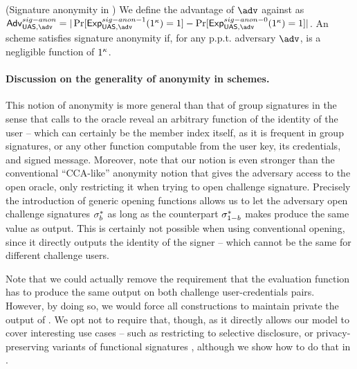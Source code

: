 \begin{definition}{(Signature anonymity in \UAS)}
  \label{def:sign-anonymity-uas}  
  We define the advantage \AdvSigAnon of $\adv$ against \ExpSigAnonb as
  $\AdvSigAnon=|\Pr\lbrack\ExpSigAnono(1^\secpar)=1\rbrack-
  \Pr\lbrack\ExpSigAnonz(1^\secpar)=1\rbrack|$.
  An \UAS scheme satisfies signature anonymity if, for any p.p.t. adversary
  $\adv$, \AdvSigAnon is a negligible function of $1^\kappa$.
\end{definition}

\paragraph{Discussion on the generality of anonymity in \UAS schemes.} %
This notion of anonymity is more general than that of group signatures in the
sense that calls to the \OPEN oracle reveal an arbitrary function of the
identity of the user -- which can certainly be the member index itself, as it
is frequent in group signatures, or any other function computable from the
user key, its credentials, and signed message. Moreover, note that
our notion is even stronger than the conventional ``CCA-like'' anonymity notion
that gives the adversary access to the open oracle, only restricting it when
trying to open challenge signature. Precisely the introduction of generic
opening functions allows us to let the adversary open challenge signatures
$\mathsf{\sigma}^*_b$ as long as the counterpart $\mathsf{\sigma}^*_{1-b}$
makes \Open produce the same \y value as output. This is certainly not
possible when using conventional opening, since it directly outputs the identity
of the signer -- which cannot be the same for different challenge users.

Note that we could actually remove the requirement that the evaluation function
has to produce the same output on both challenge user-credentials pairs.
However, by doing so, we would force all constructions to maintain private the
output of \feval. We opt not to require that, though, as it directly allows
our model to cover interesting use cases -- such as restricting to selective
disclosure, or privacy-preserving variants of functional signatures , although we show how to do that in .

